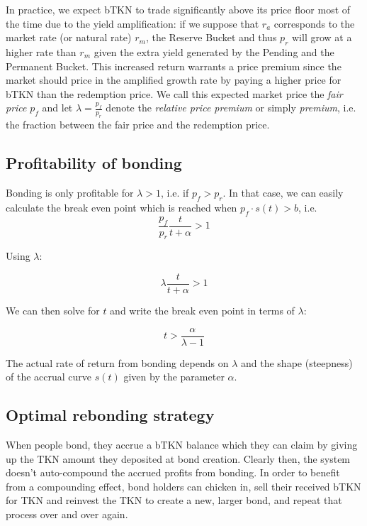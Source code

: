 \documentclass{article}
\begin{document}
In practice, we expect bTKN to trade significantly above its price floor most of the time due to the yield amplification: if we suppose that $r_a$ corresponds to the market rate (or natural rate) $r_m$, the Reserve Bucket and thus $p_r$ will grow at a higher rate than $r_m$ given the extra yield generated by the Pending and the Permanent Bucket. This increased return warrants a price premium since the market should price in the amplified growth rate by paying a higher price for bTKN than the redemption price. We call this expected market price the \textit{fair price} $p_f$ and let $\lambda = \frac{p_f}{p_r}$ denote the \textit{relative price premium} or simply \textit{premium}, i.e. the fraction between the fair price and the redemption price.

\subsection{Profitability of bonding}
Bonding is only profitable for $\lambda>1$, i.e. if $p_f>p_r$. In that case, we can easily calculate the break even point which is reached when $p_f \cdot s(t)>b$, i.e.
\begin{equation}
  \label{eq:break_even_0}
\frac{p_f}{p_r}\frac{t}{t+\alpha} > 1
\end{equation}

Using $\lambda$:

\begin{equation}
  \label{eq:break_even_0}
\lambda\frac{t}{t+\alpha} > 1
\end{equation}

We can then solve for $t$ and write the break even point in terms of $\lambda$:

\begin{equation}
  \label{eq:break_even_2}
t > \frac{\alpha}{\lambda-1}
\end{equation}

The actual rate of return from bonding depends on $\lambda$ and the shape (steepness) of the accrual curve $s(t)$ given by the parameter $\alpha$.

\subsection{Optimal rebonding strategy}
  \label{sec:rebonding_strategy}
When people bond, they accrue a bTKN balance which they can claim by giving up the TKN amount they deposited at bond creation. Clearly then, the system doesn't auto-compound the accrued profits from bonding. In order to benefit from a compounding effect, bond holders can chicken in, sell their received bTKN for TKN and reinvest the TKN to create a new, larger bond, and repeat that process over and over again.
\end{document}
